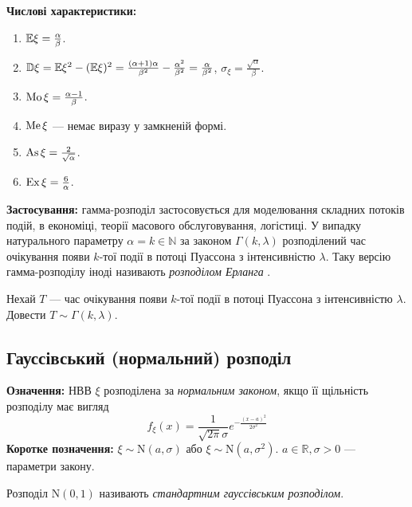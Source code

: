 \noindent\textbf{Числові характеристики:}
\begin{enumerate}
    \item $\mathbb{E}\xi = \frac{\alpha}{\beta}$.
    \item $\mathbb{D}\xi = \mathbb{E}\xi^2 - (\mathbb{E}\xi)^2 = \frac{(\alpha+1)\alpha}{\beta^2} - \frac{\alpha^2}{\beta^2} = \frac{\alpha}{\beta^2}$, $\sigma_\xi = \frac{\sqrt{\alpha}}{\beta}$.
    \item $\operatorname{Mo}\xi = \frac{\alpha-1}{\beta}$.
    \item $\operatorname{Me}\xi$ --- немає виразу у замкненій формі.
    \item $\operatorname{As}\xi = \frac{2}{\sqrt{\alpha}}$.
    \item $\operatorname{Ex}\xi = \frac{6}{\alpha}$.
\end{enumerate}

\noindent\textbf{Застосування:} гамма-розподіл застосовується для моделювання
складних потоків подій, в економіці, теорії масового обслуговування, логістиці.
У випадку натурального параметру $\alpha = k \in \mathbb{N}$ за законом
$\Gamma(k, \lambda)$ розподілений час очікування появи $k$-тої події
в потоці Пуассона  з інтенсивністю $\lambda$. Таку версію гамма-розподілу іноді називають \emph{розподілом Ерланга} .
\begin{exercise}
    Нехай $T$ --- час очікування появи $k$-тої події
    в потоці Пуассона з інтенсивністю $\lambda$. Довести $T \sim \Gamma(k, \lambda)$.
\end{exercise} %

\subsection{Гауссівський (нормальний) розподіл}
\noindent\textbf{Означення:}
    НВВ $\xi$ розподілена за \emph{нормальним законом}, 
    якщо її щільність розподілу має вигляд 
    \begin{equation}
        f_\xi(x) = \frac{1}{\sqrt{2\pi}\sigma} e^{-\frac{(x-a)^2}{2\sigma^2}}
    \end{equation}
\textbf{Коротке позначення:} $\xi \sim \mathrm{N}(a, \sigma)$ або 
    $\xi \sim \mathrm{N}(a, \sigma^2)$.
    $a \in \mathbb{R}, \sigma > 0$ --- параметри закону.

    Розподіл $\mathrm{N}(0, 1)$ називають \emph{стандартним гауссівським розподілом}.

